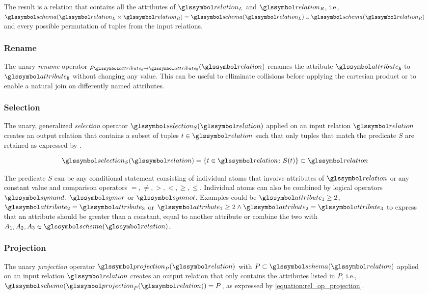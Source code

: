 The result is a relation that contains all the attributes of $\relation_L$ and $\relation_R$, i.e., $\schema(\relation_L \times \relation_R) = \schema(\relation_L) \cup \schema(\relation_R)$ and every possible permutation of tuples from the input relations.

\subsubsection{Rename}
The unary \emph{rename} operator $\rho_{\attribute_\mathtt{A} \rightarrow \attribute_\mathtt{B}}(\relation)$ renames the attribute $\attribute_\mathtt{A}$ to $\attribute_\mathtt{B}$ without changing any value. This can be useful to elliminate collisions before applying the cartesian product or to enable a natural join on differently named attributes.

\subsubsection{Selection}

The unary, generalized \emph{selection} operator $\selection_{S}(\relation)$ applied on an input relation $\relation$ creates an output relation that contains a subset of tuples $t \in \relation$ such that only tuples that match the predicate $S$ are retained as expressed by .

\begin{equation}
    \label{equation:rel_op_selection}
    \selection_{S}(\relation) = \{ t \in \relation \colon S(t) \} \subset \relation
\end{equation}

The predicate $S$ can be any conditional statement consisting of individual atoms that involve attributes of $\relation$ or any constant value and comparison operators $=,\neq,>,<,\geq, \leq$. Individual atoms can also be combined by logical operators $\symand$, $\symor$ or $\symnot$. Examples could be $\attribute_1 \geq 2$, $\attribute_2 = \attribute_3$ or $\attribute_1 \geq 2 \wedge \attribute_2 = \attribute_3$ to express that an attribute should be greater than a constant, equal to another attribute or combine the two with $A_1,A_2,A_3 \in \schema(\relation)$.


\subsubsection{Projection}
The unary \emph{projection} operator $\projection_{P}(\relation)$ with $P \subset \schema(\relation)$ applied on an input relation $\relation$ creates an output relation that only contains the attributes listed in $P$, i.e., $\schema(\projection_{P}(\relation)) = P$, as expressed by \cref{equation:rel_op_projection}.

